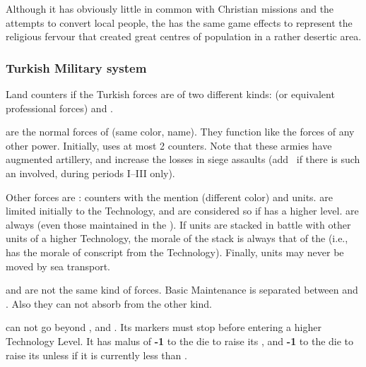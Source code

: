 \begin{designnote}
  Although it has obviously little in common with Christian missions
  and the attempts to convert local people, the \constructionKaaba has
  the same game effects to represent the religious fervour that
  created great centres of population in a rather desertic area.
\end{designnote}


\subsubsection{Turkish Military system}

Land counters if the Turkish forces are of two different kinds:
\Janissaire (or equivalent professional forces) and \Timar.

\bparag[Janissaries] \Janissaire are the normal forces of \TUR (same
color, name). They function like the forces of any other power.
Initially, \TUR uses at most 2 \Janissaire \ARMY counters.  Note that
these armies have augmented artillery, and increase the losses in siege
assaults (add \td\ if there is such an \ARMY\faceplus involved, during
periods I--III only).

\bparag[Timars] Other forces are \Timar: counters with the \Timar
mention (different color) and \Pashas units.  \Timar are limited
initially to the \TARQ Technology, and are considered so if \TUR has a
higher level.  \Timar are always  (even those
maintained in the ).  If \Timar units are stacked in
battle with other units of a higher Technology, the morale of the stack
is always that of the \Timar (i.e., has the morale of conscript from the
\Timar Technology).  Finally, \Timar units may never be moved by sea
transport.

\bparag \Janissaire and \Timar are not the same kind of forces.  Basic
Maintenance is separated between \Janissaire and \Timar.  Also they can not
absorb \LD from the other kind.

\label{chSpecific:Turkey:Army Tech}
\TUR can not go beyond  \TMUS, and  \TBAT. Its markers must stop before entering a higher Technology
Level.  It has malus of {\bf -1} to the die to raise its , and {\bf -1} to the die to raise its 
unless if it is currently less than \TARQ.

